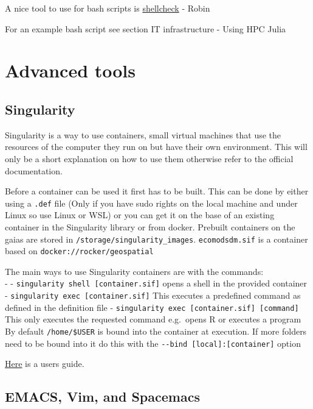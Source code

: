 \documentclass[
]{book}
\begin{document}
A nice tool to use for bash scripts is
\href{https://github.com/koalaman/shellcheck}{shellcheck} - Robin

For an example bash script see section IT infrastructure - Using HPC
Julia

\section{Advanced tools}\label{advanced-tools}

\subsection{Singularity}\label{singularity}

Singularity is a way to use containers, small virtual machines that use
the resources of the computer they run on but have their own
environment. This will only be a short explanation on how to use them
otherwise refer to the official documentation.

Before a container can be used it first has to be built. This can be
done by either using a \texttt{.def} file (Only if you have sudo rights on the
local machine and under Linux so use Linux or WSL) or you can get it on
the base of an existing container in the Singularity library or from
docker. Prebuilt containers on the gaias are stored in
\texttt{/storage/singularity\_images}. \texttt{ecomodsdm.sif} is a container based on
\texttt{docker://rocker/geospatial}

The main ways to use Singularity containers are with the commands:\\
- - \texttt{singularity\ shell\ {[}container.sif{]}} opens a shell in the provided
container - \texttt{singularity\ exec\ {[}container.sif{]}} This executes a
predefined command as defined in the definition file -
\texttt{singularity\ exec\ {[}container.sif{]}\ {[}command{]}} This only executes the
requested command e.g.~opens R or executes a program\\
By default \texttt{/home/\$USER} is bound into the container at execution. If
more folders need to be bound into it do this with the
\texttt{-\/-bind\ {[}local{]}:{[}container{]}} option

\href{https://sylabs.io/guides/3.5/user-guide/quick_start.html}{Here} is a
users guide.

\subsection{EMACS, Vim, and Spacemacs}\label{emacs-vim-and-spacemacs}
\end{document}
